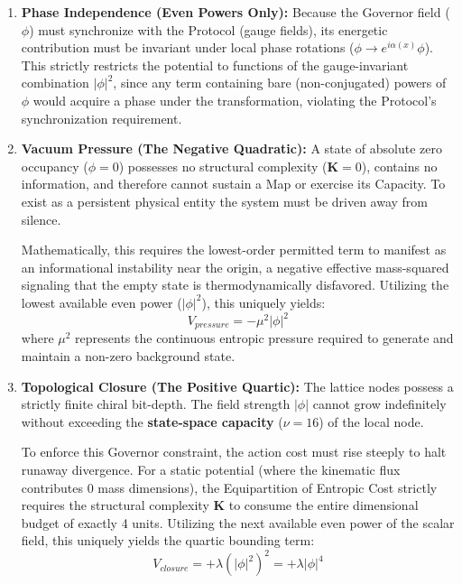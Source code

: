 \begin{enumerate}
    \item \textbf{Phase Independence (Even Powers Only):} Because the Governor field ($\phi$) must synchronize with the Protocol (gauge fields), its energetic contribution must be invariant under local phase rotations ($\phi \to e^{i\alpha(x)}\phi$). This strictly restricts the potential to functions of the gauge-invariant combination $|\phi|^2$, since any term containing bare (non-conjugated) powers of $\phi$ would acquire a phase under the transformation, violating the Protocol's synchronization requirement.

    \item \textbf{Vacuum Pressure (The Negative Quadratic):}
    A state of absolute zero occupancy ($\phi = 0$) possesses no structural complexity ($\mathbf{K}=0$), contains no information, and therefore cannot sustain a Map or exercise its Capacity. To exist as a persistent physical entity the system must be driven away from silence. 
    
    Mathematically, this requires the lowest-order permitted term to manifest as an informational instability near the origin, a negative effective mass-squared signaling that the empty state is thermodynamically disfavored. Utilizing the lowest available even power ($|\phi|^2$), this uniquely yields:
    \begin{equation}
        V_{pressure} = -\mu^2 |\phi|^2
    \end{equation}
    where $\mu^2$ represents the continuous entropic pressure required to generate and maintain a non-zero background state.

    \item \textbf{Topological Closure (The Positive Quartic):}
    The lattice nodes possess a strictly finite chiral bit-depth. The field strength $|\phi|$ cannot grow indefinitely without exceeding the \textbf{state-space capacity} ($\nu=16$) of the local node. 
    
    To enforce this Governor constraint, the action cost must rise steeply to halt runaway divergence. For a static potential (where the kinematic flux contributes $0$ mass dimensions), the Equipartition of Entropic Cost strictly requires the structural complexity $\mathbf{K}$ to consume the entire dimensional budget of exactly 4 units. Utilizing the next available even power of the scalar field, this uniquely yields the quartic bounding term:
    \begin{equation}
        V_{closure} = +\lambda (|\phi|^2)^2 = +\lambda |\phi|^4
    \end{equation}


\end{enumerate}
